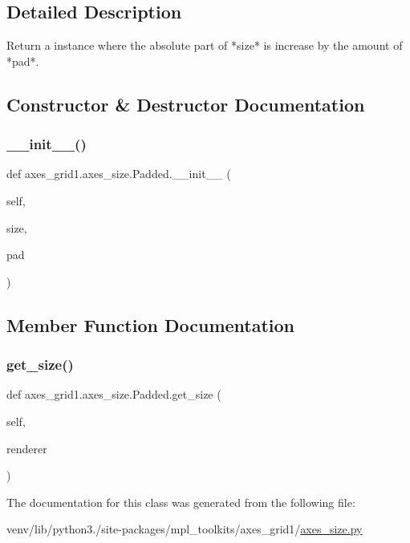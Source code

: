 \subsection{Detailed Description}
\begin{DoxyVerb}Return a instance where the absolute part of *size* is
increase by the amount of *pad*.
\end{DoxyVerb}
 

\subsection{Constructor \& Destructor Documentation}
\mbox{\label{classaxes__grid1_1_1axes__size_1_1Padded_a307774345c0068d244ca7cd7ad4612b7}} 
\subsubsection{\texorpdfstring{\+\_\+\+\_\+init\+\_\+\+\_\+()}{\_\_init\_\_()}}
{\footnotesize\ttfamily def axes\+\_\+grid1.\+axes\+\_\+size.\+Padded.\+\_\+\+\_\+init\+\_\+\+\_\+ (\begin{DoxyParamCaption}\item[{}]{self,  }\item[{}]{size,  }\item[{}]{pad }\end{DoxyParamCaption})}



\subsection{Member Function Documentation}
\mbox{\label{classaxes__grid1_1_1axes__size_1_1Padded_af39130be03329db73d2c9f93e45f035b}} 
\subsubsection{\texorpdfstring{get\+\_\+size()}{get\_size()}}
{\footnotesize\ttfamily def axes\+\_\+grid1.\+axes\+\_\+size.\+Padded.\+get\+\_\+size (\begin{DoxyParamCaption}\item[{}]{self,  }\item[{}]{renderer }\end{DoxyParamCaption})}



The documentation for this class was generated from the following file\+:\begin{DoxyCompactItemize}
\item 
venv/lib/python3./site-\/packages/mpl\+\_\+toolkits/axes\+\_\+grid1/\hyperlink{_2axes__size_8py}{axes\+\_\+size.\+py}\end{DoxyCompactItemize}
